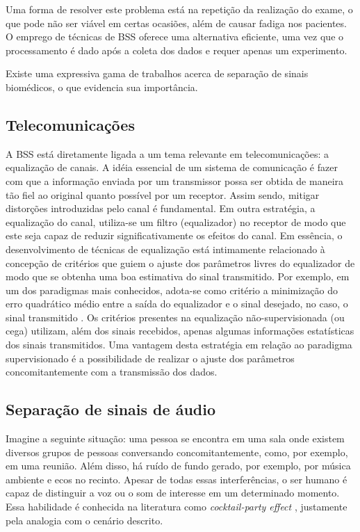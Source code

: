     Uma forma de resolver este problema está na repetição da realização do exame, o que pode não ser viável em certas ocasiões, além de causar fadiga nos pacientes. O emprego de técnicas de BSS oferece uma alternativa eficiente, uma vez que o processamento é dado após a coleta dos dados e requer apenas um experimento.
    
    Existe uma expressiva gama de trabalhos acerca de separação de sinais biomédicos, o que evidencia sua importância.
    
\subsection{Telecomunicações}

    A BSS está diretamente ligada a um tema relevante em telecomunicações: a equalização de canais. A idéia essencial de um sistema de comunicação é fazer com que a informação enviada por um transmissor possa ser obtida de maneira tão fiel ao original quanto possível por um receptor. Assim sendo, mitigar distorções introduzidas pelo canal é fundamental. Em outra estratégia, a equalização do canal, utiliza-se um filtro (equalizador) no receptor de modo que este seja capaz de reduzir significativamente os efeitos do canal. Em essência, o desenvolvimento de técnicas de equalização está intimamente relacionado à concepção de critérios que guiem o ajuste dos parâmetros livres do equalizador de modo que se obtenha uma boa estimativa do sinal transmitido.
    Por exemplo, em um dos paradigmas mais conhecidos, adota-se como critério a minimização do erro quadrático médio entre a saída do equalizador e o sinal desejado, no caso, o sinal transmitido \cite{Haykin}. Os critérios presentes na equalização não-supervisionada (ou cega) utilizam, além dos sinais recebidos, apenas algumas informações estatísticas dos sinais transmitidos. Uma vantagem desta estratégia em relação ao paradigma supervisionado é a possibilidade de realizar o ajuste dos parâmetros concomitantemente com a transmissão dos dados.
    
\subsection{Separação de sinais de áudio}

    Imagine a seguinte situação: uma pessoa se encontra em uma sala onde existem diversos grupos de pessoas conversando concomitantemente, como, por exemplo, em uma reunião. Além disso, há ruído de fundo gerado, por exemplo, por música ambiente e ecos no recinto. Apesar de todas essas interferências, o ser humano é capaz de distinguir a voz ou o som de interesse em um determinado momento. Essa habilidade é conhecida na literatura como \textit{cocktail-party effect} \cite{cocktail}, justamente pela analogia com o cenário descrito.

